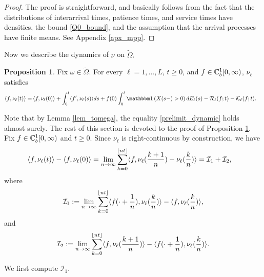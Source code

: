 \documentclass{article}
\theoremstyle{definition}
\newtheorem{proposition}[theorem]{Proposition}
\numberwithin{equation}{section}
\begin{document}
\begin{proof}
The proof is straightforward, and basically follows from the fact that the distributions of interarrival times, patience times, and service times have densities, the bound \eqref{Q0_bound}, and the assumption that the arrival processes have finite means.  See Appendix \ref{apx_mpp}.
\end{proof}

Now we describe the dynamics of $\nu$ on $\tilde\Omega.$

\begin{proposition}\label{prop_prelim}
Fix $\omega\in\tilde\Omega$. For every $\ell=1,...,L$, $t\geq0$, and $f\in\mathbb{C}_b^{1}[0,\infty)$, $\nu_\ell$ satisfies
\begin{align}\label{prelimit_dynamic}
  \pairil{f}{\nu_\ell(t)}= & \pair{f}{\nu_\ell(0)}+ \int_{0}^{t}\pairil{f'}{\nu_\ell(s)}ds+   f(0)\int_0^t\indic{X(s-)>0}d\arrival_{\ell}(s)  -\renegC_\ell(f;t)-\entryC_\ell(f;t).
\end{align}
\end{proposition}

Note that by Lemma \ref{lem_tomega}, the equality \eqref{prelimit_dynamic} holds almost surely. The rest of this section is devoted to the proof of Proposition \ref{prop_prelim}. Fix $f\in\mathbb{C}_b^{1}[0,\infty)$ and $t\geq0$. Since $\nu_\ell$ is right-continuous by construction, we have
\begin{align}\label{deltanu}
    \langle f,\nu_\ell(t)\rangle-\left\langle f , \nu_\ell(0) \right\rangle &=\lim_{n\to\infty}\sum_{k=0}^{\lfloor nt\rfloor} \langle f,\nu_\ell(\frac{k+1}{n})-\nu_\ell(\frac{k}{n})\rangle= \mathcal{I}_1+\mathcal{I}_2,
\end{align}
where
\begin{equation}\label{def_I1}
     \mathcal{I}_1:= \lim_{n\to\infty}\sum_{k=0}^{\lfloor nt\rfloor} \langle f(\cdot+\frac{1}{n}),\nu_\ell(\frac{k}{n})\rangle-\langle f,\nu_\ell(\frac{k}{n})\rangle,
\end{equation}
and
\begin{equation}\label{def_I2}
    \mathcal{I}_2 := \lim_{n\to\infty}\sum_{k=0}^{\lfloor nt\rfloor} \langle f,\nu_\ell(\frac{k+1}{n})\rangle-\langle f(\cdot+\frac{1}{n}),\nu_\ell(\frac{k}{n})\rangle.
\end{equation}

We first compute $\mathcal{I}_1$.
\end{document}
